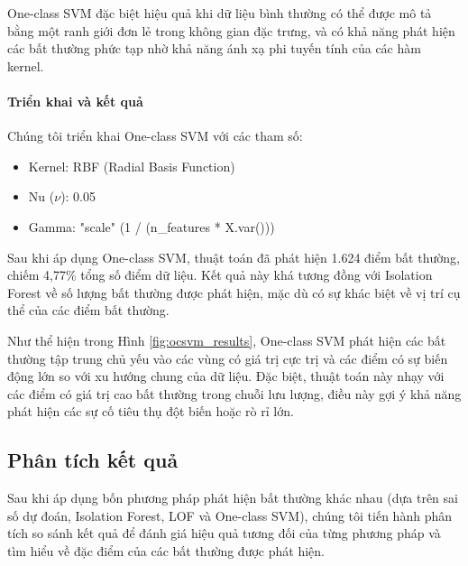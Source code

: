 One-class SVM đặc biệt hiệu quả khi dữ liệu bình thường có thể được mô tả bằng một ranh giới đơn lẻ trong không gian đặc trưng, và có khả năng phát hiện các bất thường phức tạp nhờ khả năng ánh xạ phi tuyến tính của các hàm kernel.

\paragraph{Triển khai và kết quả}
Chúng tôi triển khai One-class SVM với các tham số:
\begin{itemize}
    \item Kernel: RBF (Radial Basis Function)
    \item Nu ($\nu$): 0.05
    \item Gamma: "scale" (1 / (n\_features * X.var()))
\end{itemize}

Sau khi áp dụng One-class SVM, thuật toán đã phát hiện 1.624 điểm bất thường, chiếm 4,77\% tổng số điểm dữ liệu. Kết quả này khá tương đồng với Isolation Forest về số lượng bất thường được phát hiện, mặc dù có sự khác biệt về vị trí cụ thể của các điểm bất thường.


Như thể hiện trong Hình \ref{fig:ocsvm_results}, One-class SVM phát hiện các bất thường tập trung chủ yếu vào các vùng có giá trị cực trị và các điểm có sự biến động lớn so với xu hướng chung của dữ liệu. Đặc biệt, thuật toán này nhạy với các điểm có giá trị cao bất thường trong chuỗi lưu lượng, điều này gợi ý khả năng phát hiện các sự cố tiêu thụ đột biến hoặc rò rỉ lớn.

\subsection{Phân tích kết quả}

Sau khi áp dụng bốn phương pháp phát hiện bất thường khác nhau (dựa trên sai số dự đoán, Isolation Forest, LOF và One-class SVM), chúng tôi tiến hành phân tích so sánh kết quả để đánh giá hiệu quả tương đối của từng phương pháp và tìm hiểu về đặc điểm của các bất thường được phát hiện.

